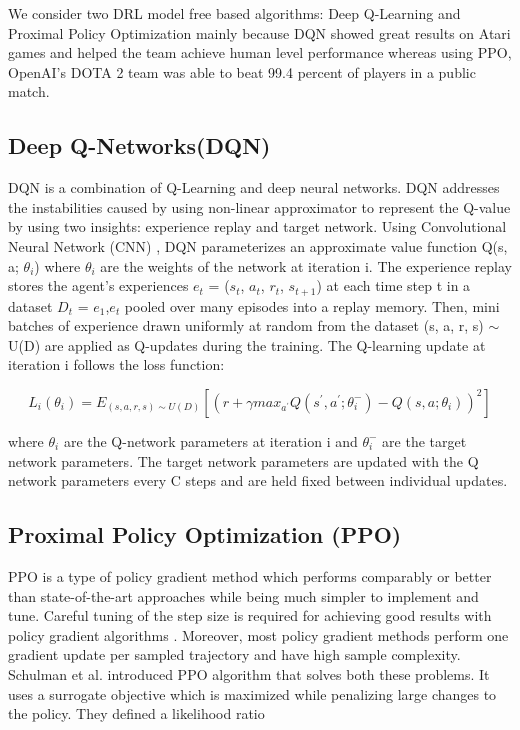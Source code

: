 \documentclass[12pt]{report}
\begin{document}
We consider two DRL model free based algorithms: Deep Q-Learning and Proximal Policy Optimization mainly because DQN showed great results on Atari games and helped the team achieve human level performance whereas using PPO, OpenAI's DOTA 2 team was able to beat 99.4 percent of players in a public match.  \\

\subsection{Deep Q-Networks(DQN)} DQN is a combination of Q-Learning and deep neural networks. DQN addresses the instabilities caused by using non-linear approximator to represent the Q-value by using two insights: experience replay and target network. 
Using Convolutional Neural Network (CNN) , DQN parameterizes an approximate value function Q(s, a; $\theta_i$) where $\theta_i$ are the weights of the network at iteration i. The experience replay stores the agent’s experiences $e_t$ = ($s_t$, $a_t$, $r_t$, $s_{t+1}$) at each time step t in a dataset $D_t$ = $e_1$,$e_t$ pooled over many episodes into a replay
memory. Then, mini batches of experience drawn uniformly at random from the dataset (s, a, r, s) $\sim$ U(D) are applied as Q-updates during the training. The
Q-learning update at iteration i follows the loss function:

\[ L_i (\theta_i) = E_{(s,a,r,s) \sim U(D) } [(r +  \gamma max_{a^{'}} Q(s^{'}, a^{'} ; \theta_i^{-}) - Q(s,a; \theta_{i}))^2] \]

\hfill \break
where $\theta_i$ are the Q-network parameters at iteration i and $\theta_i^{-}$  are the target network parameters. The target network parameters are updated with the Q network parameters every C steps and are held fixed between individual updates. \\

\subsection{Proximal Policy Optimization (PPO)} PPO is a type of policy gradient method which performs  comparably or better than state-of-the-art approaches while being much simpler to implement and tune. Careful tuning of the step size is required for achieving good results with policy gradient algorithms \cite{PPO}. Moreover, most policy gradient methods perform one gradient update per sampled trajectory and have high sample complexity. Schulman et al. \cite{Schulman} introduced PPO algorithm that solves both these problems. It uses a surrogate objective which is maximized while penalizing large changes to the policy. 
They defined a likelihood ratio 
\end{document}
